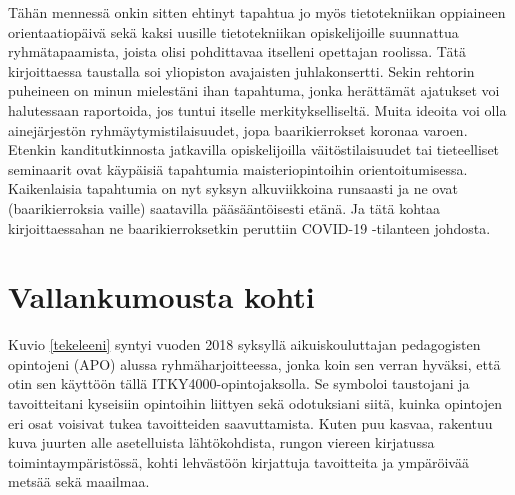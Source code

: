 \documentclass[utf8]{gradu3}
\begin{document}
Tähän mennessä onkin sitten ehtinyt tapahtua jo myös tietotekniikan oppiaineen
orientaatiopäivä sekä kaksi uusille tietotekniikan opiskelijoille suunnattua
ryhmätapaamista, joista olisi pohdittavaa itselleni opettajan roolissa. Tätä
kirjoittaessa taustalla soi yliopiston avajaisten juhlakonsertti. Sekin rehtorin
puheineen on minun mielestäni ihan tapahtuma, jonka herättämät ajatukset voi
halutessaan raportoida, jos tuntui itselle merkitykselliseltä. Muita ideoita voi
olla ainejärjestön ryhmäytymistilaisuudet, jopa baarikierrokset koronaa varoen.
Etenkin kanditutkinnosta jatkavilla opiskelijoilla väitöstilaisuudet tai
tieteelliset seminaarit ovat käypäisiä tapahtumia maisteriopintoihin
orientoitumisessa. Kaikenlaisia tapahtumia on nyt syksyn alkuviikkoina runsaasti
ja ne ovat (baarikierroksia vaille) saatavilla pääsääntöisesti etänä. Ja tätä
kohtaa kirjoittaessahan ne baarikierroksetkin peruttiin COVID-19 -tilanteen
johdosta.






\chapter{Vallankumousta kohti}
\label{kuvanPohdintaa}


Kuvio \ref{tekeleeni} syntyi vuoden 2018 syksyllä aikuiskouluttajan pedagogisten
opintojeni (APO) alussa ryhmäharjoitteessa, jonka koin sen verran hyväksi, että
otin sen käyttöön tällä ITKY4000-opintojaksolla. Se symboloi taustojani ja
tavoitteitani kyseisiin opintoihin liittyen sekä odotuksiani siitä, kuinka
opintojen eri osat voisivat tukea tavoitteiden saavuttamista. Kuten puu kasvaa,
rakentuu kuva juurten alle asetelluista lähtökohdista, rungon viereen kirjatussa
toimintaympäristössä, kohti lehvästöön kirjattuja tavoitteita ja ympäröivää
metsää sekä maailmaa.
\end{document}
